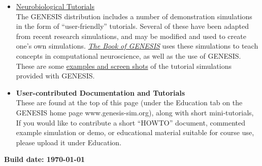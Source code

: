 \documentclass[12pt]{article}
\begin{document}
\begin{itemize}
\item \href{http://www.genesis-sim.org/GENESIS/Tutorials_summary.html}{Neurobiological Tutorials}\\
The GENESIS distribution includes a number of demonstration simulations in the form of ``user-friendly'' tutorials. Several of these have been adapted from recent research simulations, and may be modified and used to create one's own simulations. \href{http://www.genesis-sim.org/GENESIS/bog/bog.html}{\it The Book of GENESIS} uses these simulations to teach concepts in computational neuroscience, as well as the use of GENESIS. These are some  \href{http://www.genesis-sim.org/GENESIS/illtuts/illtuts.html}{examples and screen shots} of the tutorial simulations provided with GENESIS.

\item {\bf User-contributed Documentation and Tutorials}\\
These are found at the top of this page (under the Education tab on the GENESIS home page www.genesis-sim.org), along with short mini-tutorials, If you would like to contribute a short ``HOWTO'' document, commented example simulation or demo, or educational material suitable for course use, please upload it under Education.

\end{itemize}

{\bf Build date: \today}
\end{document}
